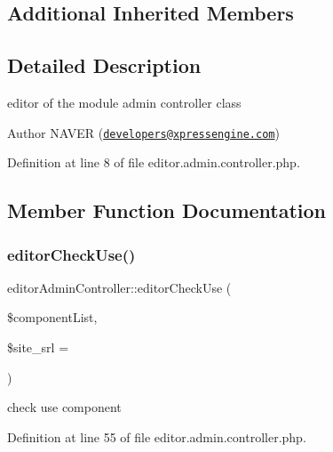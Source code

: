 \subsection*{Additional Inherited Members}


\subsection{Detailed Description}
editor of the module admin controller class 

\begin{DoxyAuthor}{Author}
N\+A\+V\+ER (\href{mailto:developers@xpressengine.com}{\tt developers@xpressengine.\+com}) 
\end{DoxyAuthor}


Definition at line 8 of file editor.\+admin.\+controller.\+php.



\subsection{Member Function Documentation}
\mbox{\label{classeditorAdminController_ae4663ef7946d055274d39810ef76198a}} 
\subsubsection{\texorpdfstring{editor\+Check\+Use()}{editorCheckUse()}}
{\footnotesize\ttfamily editor\+Admin\+Controller\+::editor\+Check\+Use (\begin{DoxyParamCaption}\item[{}]{\$component\+List,  }\item[{}]{\$site\+\_\+srl = {} }\end{DoxyParamCaption})}



check use component 



Definition at line 55 of file editor.\+admin.\+controller.\+php.

\mbox{\label{classeditorAdminController_a531785272cc7a46e86dce7a308a18286}} 

